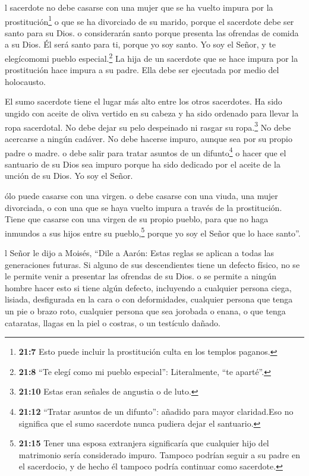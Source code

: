  l sacerdote no debe casarse con una mujer que se ha vuelto
impura por la prostitución\footnote{\textbf{21:7} Esto puede incluir la
  prostitución culta en los templos paganos.} o que se ha divorciado de
su marido, porque el sacerdote debe ser santo para su Dios. 
o considerarán santo porque presenta las ofrendas de comida a su Dios.
Él será santo para ti, porque yo soy santo. Yo soy el Señor, y te
elegícomomi pueblo especial.\footnote{\textbf{21:8} ``Te elegí como mi
  pueblo especial'': Literalmente, ``te aparté''.}  La hija
de un sacerdote que se hace impura por la prostitución hace impura a su
padre. Ella debe ser ejecutada por medio del holocausto.

 El sumo sacerdote tiene el lugar más alto entre los otros
sacerdotes. Ha sido ungido con aceite de oliva vertido en su cabeza y ha
sido ordenado para llevar la ropa sacerdotal. No debe dejar su pelo
despeinado ni rasgar su ropa.\footnote{\textbf{21:10} Estas eran señales
  de angustia o de luto.}  No debe acercarse a ningún
cadáver. No debe hacerse impuro, aunque sea por su propio padre o madre.
 o debe salir para tratar asuntos de un difunto\footnote{\textbf{21:12}
  ``Tratar asuntos de un difunto'': añadido para mayor claridad.Eso no
  significa que el sumo sacerdote nunca pudiera dejar el santuario.} o
hacer que el santuario de su Dios sea impuro porque ha sido dedicado por
el aceite de la unción de su Dios. Yo soy el Señor.

 ólo puede casarse con una virgen.  o debe
casarse con una viuda, una mujer divorciada, o con una que se haya
vuelto impura a través de la prostitución. Tiene que casarse con una
virgen de su propio pueblo,  para que no haga inmundos a
sus hijos entre su pueblo,\footnote{\textbf{21:15} Tener una esposa
  extranjera significaría que cualquier hijo del matrimonio sería
  considerado impuro. Tampoco podrían seguir a su padre en el
  sacerdocio, y de hecho él tampoco podría continuar como sacerdote.}
porque yo soy el Señor que lo hace santo''.

 l Señor le dijo a Moisés,  ``Dile a Aarón:
Estas reglas se aplican a todas las generaciones futuras. Si alguno de
sus descendientes tiene un defecto físico, no se le permite venir a
presentar las ofrendas de su Dios.  o se permite a ningún
hombre hacer esto si tiene algún defecto, incluyendo a cualquier persona
ciega, lisiada, desfigurada en la cara o con deformidades, 
cualquier persona que tenga un pie o brazo roto,  cualquier
persona que sea jorobada o enana, o que tenga cataratas, llagas en la
piel o costras, o un testículo dañado.

